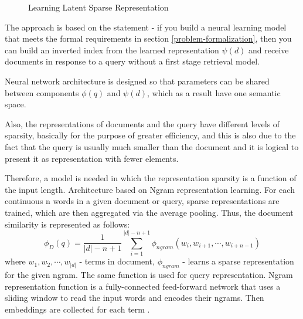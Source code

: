 \documentclass[
    twocolumn,
]{ceurart}
\begin{document}
    \begin{figure}[h]
        \centering
        \def\svgwidth{\columnwidth}
        
        \caption{Learning Latent Sparse Representation}
    \end{figure}

    The approach is based on the statement - if you build a neural learning model that meets the
    formal requirements in section \ref{problem-formalization}, then you can build an inverted
    index from the learned representation $\psi(d)$ and receive documents in response to a query
    without a first stage retrieval model.

    Neural network architecture is designed so that parameters can be shared between components
    $\phi(q)$ and $\psi(d)$, which as a result have one semantic space.

    Also, the representations of documents and the query have different levels of sparsity,
    basically for the purpose of greater efficiency, and this is also due to the fact that
    the query is usually much smaller than the document and it is logical to present it as
    representation with fewer elements.

    Therefore, a model is needed in which the representation sparsity is a function
    of the input length.
    Architecture based on Ngram representation learning.
    For each continuous n words in a given document or query, sparse representations are trained,
    which are then aggregated via the average pooling.
    Thus, the document similarity is represented as follows:
    \begin{equation}
        \phi_D(q)=\frac{1}{|d| - n + 1} \sum_{i=1}^{|d| - n + 1} \phi_{ngram}(w_i, w_{i+1}, \cdots, w_{i+n-1})
    \end{equation}
    where $w_1, w_2, \cdots, w_{|d|}$ - terms in document, $\phi_{ngram}$ - learns a sparse representation
    for the given ngram.
    The same function is used for query representation.
    Ngram representation function is a fully-connected feed-forward network that uses a sliding
    window to read the input words and encodes their ngrams.
    Then embeddings are collected for each term \cite{SNRM}.
\end{document}
